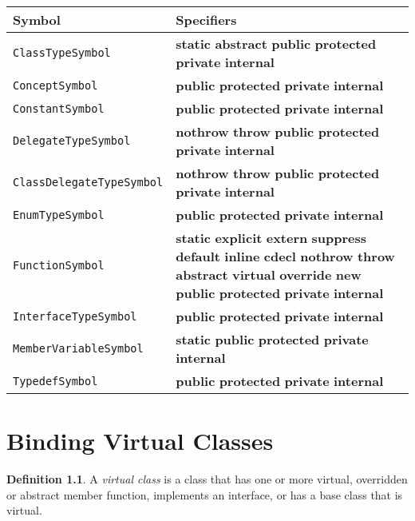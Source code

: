 \documentclass[a4paper,oneside,11pt]{book}
\theoremstyle{definition}
\newtheorem{defn}{Definition}[section]
\begin{document}
\begin{flushleft}
\begin{supertabular}{lp{10cm}}
\textbf{Symbol}& \textbf{Specifiers}\\
\hline
\verb|ClassTypeSymbol|& \textbf{static} \textbf{abstract} \textbf{public} \textbf{protected} \textbf{private} \textbf{internal}\\
\verb|ConceptSymbol|& \textbf{public} \textbf{protected} \textbf{private} \textbf{internal}\\
\verb|ConstantSymbol|& \textbf{public} \textbf{protected} \textbf{private} \textbf{internal}\\
\verb|DelegateTypeSymbol|& \textbf{nothrow} \textbf{throw} \textbf{public} \textbf{protected} \textbf{private} \textbf{internal}\\
\verb|ClassDelegateTypeSymbol|& \textbf{nothrow} \textbf{throw} \textbf{public} \textbf{protected} \textbf{private} \textbf{internal}\\
\verb|EnumTypeSymbol|& \textbf{public} \textbf{protected} \textbf{private} \textbf{internal}\\
\verb|FunctionSymbol|&
\textbf{static} \textbf{explicit} \textbf{extern} \textbf{suppress} \textbf{default} \textbf{inline} \textbf{cdecl} \textbf{nothrow} \textbf{throw}
\textbf{abstract} \textbf{virtual} \textbf{override} \textbf{new}
\textbf{public} \textbf{protected} \textbf{private} \textbf{internal}\\
\verb|InterfaceTypeSymbol|& \textbf{public} \textbf{protected} \textbf{private} \textbf{internal}\\
\verb|MemberVariableSymbol|& \textbf{static} \textbf{public} \textbf{protected} \textbf{private} \textbf{internal}\\
\verb|TypedefSymbol|& \textbf{public} \textbf{protected} \textbf{private} \textbf{internal}\\
\hline
\end{supertabular}
\end{flushleft}

\chapter{Binding Virtual Classes}\label{bindingvirtualclasses}

\begin{defn}\label{virtualclass} A \emph{virtual class} is a class that has one or more virtual, overridden or abstract member function, implements an interface,
or has a base class that is virtual.
\end{defn}
\end{document}

